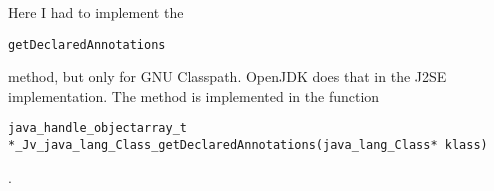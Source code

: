 \documentclass[a4paper, 10pt, titlepage]{scrartcl} %
\begin{document}
Here I had to implement the \begin{scriptsize}\verb|getDeclaredAnnotations|\end{scriptsize} method, but only for
GNU Classpath. OpenJDK does that in the J2SE implementation. The method is
implemented in the function \begin{scriptsize}\verb|java_handle_objectarray_t|\hspace{0.0pt}\verb| |\hspace{0.0pt}\verb||\hspace{0.0pt}\verb|*|\hspace{0.0pt}\verb|_Jv_java_lang_Class_getDeclaredAnnotations|\hspace{0.0pt}\verb|(|\hspace{0.0pt}\verb|java_lang_Class|\hspace{0.0pt}\verb|*|\hspace{0.0pt}\verb||\hspace{0.0pt}\verb| |\hspace{0.0pt}\verb|klass|\hspace{0.0pt}\verb|)|\hspace{0.0pt}\verb||\end{scriptsize}.
\end{document}
